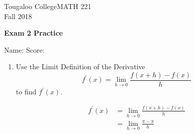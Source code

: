 \documentclass{exam}
\def\ans#1{\hfill \textcolor{lightgray}{#1}}
\begin{document}
\noindent
Tougaloo College\hfill MATH 221 \\
Fall 2018 \hfill %
\begin{center}
{\bf Exam 2 Practice} 
\end{center}

\medskip
\noindent
Name:\underline{\hspace{3in}} \hfill Score:\underline{\hspace{0.8in}}

\medskip
\begin{enumerate}
\item
Use the Limit Definition of the Derivative 
\[
f^{\prime}(x)=\lim_{h\rightarrow 0}\frac{f(x+h)-f(x)}{h}
\]
to find $f^{\prime}(x)$. %

\begin{align*}
  f^{\prime}(x) & = \lim_{h\rightarrow 0}\frac{f(x+h)-f(x)}{h}\\
                & = \lim_{h\rightarrow 0}\frac{\pi-\pi}{h}
\end{align*}




\newpage







\end{enumerate}
\end{document}
